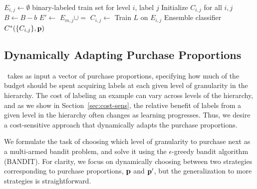 \documentclass[10pt,conference,compsocconf]{IEEEtran}
\newcommand{\sys}{\Call{Hal}{}} %
\begin{document}
\begin{algorithm}[ht]
\small{
\caption{Method for learning the concept at the root of labeling tree $T$.  
See text for 
Purchase and LabelMap.
}
\label{alg:treetrain}
\begin{algorithmic}
\State  $E_{i,j} \gets \emptyset$  \Comment binary-labeled train set for
level $i$, label $j$
\State Initialize $C_{i,j}$ for all $i, j$
  \State $B \gets B-b$
    \State $E' \gets$ 
           \State $E_{m,j} \cup=$  
       \EndFor
    \EndFor
  \EndFor
    \State $C_{i,j} \gets$ Train $L$ on $E_{i,j}$
  \EndFor
  \EndFor
\EndWhile
\State \Return Ensemble classifier $C^*(\{C_{i,j}\}, {\bf p})$
\EndFunction
\end{algorithmic}
}
\end{algorithm}

\subsection{Dynamically Adapting Purchase Proportions}
\label{sec:adaptive}

\sys\ takes as input a vector of purchase proportions, specifying how much of the budget should be
spent acquiring labels at each given level of granularity in the hierarchy.  The cost of labeling an example can
vary across levels of the hierarchy, and as we show in Section~\ref{sec:cost-sens}, the relative benefit of labels from a given
level in the hierarchy often changes as learning progresses.  Thus, we desire a cost-sensitive approach that dynamically
adapts the purchase proportions.

We formulate the task of choosing which level of granularity to purchase next as a multi-armed bandit problem, and solve it using
the $\epsilon$-greedy bandit algorithm~\cite{Auer2002} (BANDIT).  For clarity, we focus on dynamically choosing
between two strategies corresponding to purchase proportions, ${\bf p}$ and ${\bf p'}$, but the generalization to more strategies is straightforward.
\end{document}
